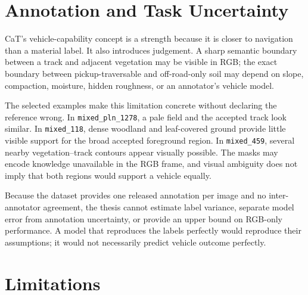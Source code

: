 \section{Annotation and Task Uncertainty}

CaT's vehicle-capability concept is a strength because it is closer to
navigation than a material label. It also introduces judgement. A sharp
semantic boundary between a track and adjacent vegetation may be visible in
RGB; the exact boundary between pickup-traversable and off-road-only soil may
depend on slope, compaction, moisture, hidden roughness, or an annotator's
vehicle model.

The selected examples make this limitation concrete without declaring the
reference wrong. In \texttt{mixed\_pln\_1278}, a pale field and the accepted
track look similar. In \texttt{mixed\_118}, dense woodland and leaf-covered
ground provide little visible support for the broad accepted foreground
region. In \texttt{mixed\_459}, several nearby vegetation--track contours
appear visually possible. The masks may encode knowledge unavailable
in the RGB frame, and visual ambiguity does not imply that both regions would
support a vehicle equally.

Because the dataset provides one released annotation per image and no
inter-annotator agreement, the thesis cannot estimate label variance, separate
model error from annotation uncertainty, or provide an upper bound on
RGB-only performance. A model that reproduces the labels perfectly would
reproduce their assumptions; it would not necessarily predict vehicle outcome
perfectly.

\section{Limitations}

